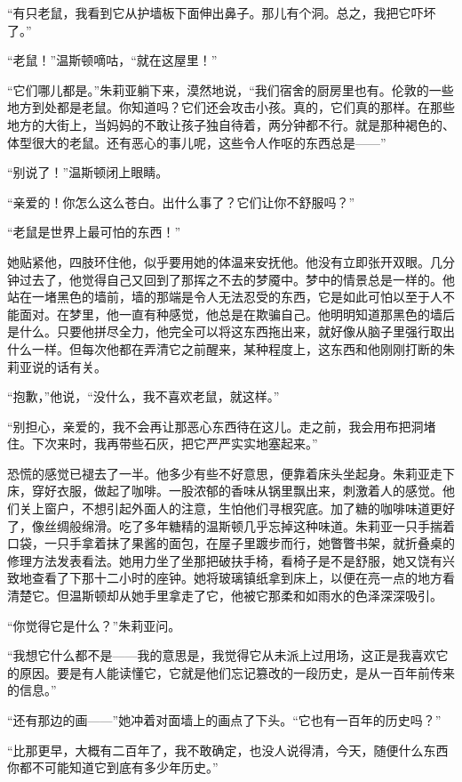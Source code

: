 ``有只老鼠，我看到它从护墙板下面伸出鼻子。那儿有个洞。总之，我把它吓坏了。''

``老鼠！''温斯顿嘀咕，``就在这屋里！''

``它们哪儿都是。''朱莉亚躺下来，漠然地说，``我们宿舍的厨房里也有。伦敦的一些地方到处都是老鼠。你知道吗？它们还会攻击小孩。真的，它们真的那样。在那些地方的大街上，当妈妈的不敢让孩子独自待着，两分钟都不行。就是那种褐色的、体型很大的老鼠。还有恶心的事儿呢，这些令人作呕的东西总是——''

``别说了！''温斯顿闭上眼睛。

``亲爱的！你怎么这么苍白。出什么事了？它们让你不舒服吗？''

``老鼠是世界上最可怕的东西！''

她贴紧他，四肢环住他，似乎要用她的体温来安抚他。他没有立即张开双眼。几分钟过去了，他觉得自己又回到了那挥之不去的梦魇中。梦中的情景总是一样的。他站在一堵黑色的墙前，墙的那端是令人无法忍受的东西，它是如此可怕以至于人不能面对。在梦里，他一直有种感觉，他总是在欺骗自己。他明明知道那黑色的墙后是什么。只要他拼尽全力，他完全可以将这东西拖出来，就好像从脑子里强行取出什么一样。但每次他都在弄清它之前醒来，某种程度上，这东西和他刚刚打断的朱莉亚说的话有关。

``抱歉，''他说，``没什么，我不喜欢老鼠，就这样。''

``别担心，亲爱的，我不会再让那恶心东西待在这儿。走之前，我会用布把洞堵住。下次来时，我再带些石灰，把它严严实实地塞起来。''

恐慌的感觉已褪去了一半。他多少有些不好意思，便靠着床头坐起身。朱莉亚走下床，穿好衣服，做起了咖啡。一股浓郁的香味从锅里飘出来，刺激着人的感觉。他们关上窗户，不想引起外面人的注意，生怕他们寻根究底。加了糖的咖啡味道更好了，像丝绸般绵滑。吃了多年糖精的温斯顿几乎忘掉这种味道。朱莉亚一只手揣着口袋，一只手拿着抹了果酱的面包，在屋子里踱步而行，她瞥瞥书架，就折叠桌的修理方法发表看法。她用力坐了坐那把破扶手椅，看椅子是不是舒服，她又饶有兴致地查看了下那十二小时的座钟。她将玻璃镇纸拿到床上，以便在亮一点的地方看清楚它。但温斯顿却从她手里拿走了它，他被它那柔和如雨水的色泽深深吸引。

``你觉得它是什么？''朱莉亚问。

``我想它什么都不是——我的意思是，我觉得它从未派上过用场，这正是我喜欢它的原因。要是有人能读懂它，它就是他们忘记篡改的一段历史，是从一百年前传来的信息。''

``还有那边的画——''她冲着对面墙上的画点了下头。``它也有一百年的历史吗？''

``比那更早，大概有二百年了，我不敢确定，也没人说得清，今天，随便什么东西你都不可能知道它到底有多少年历史。''

